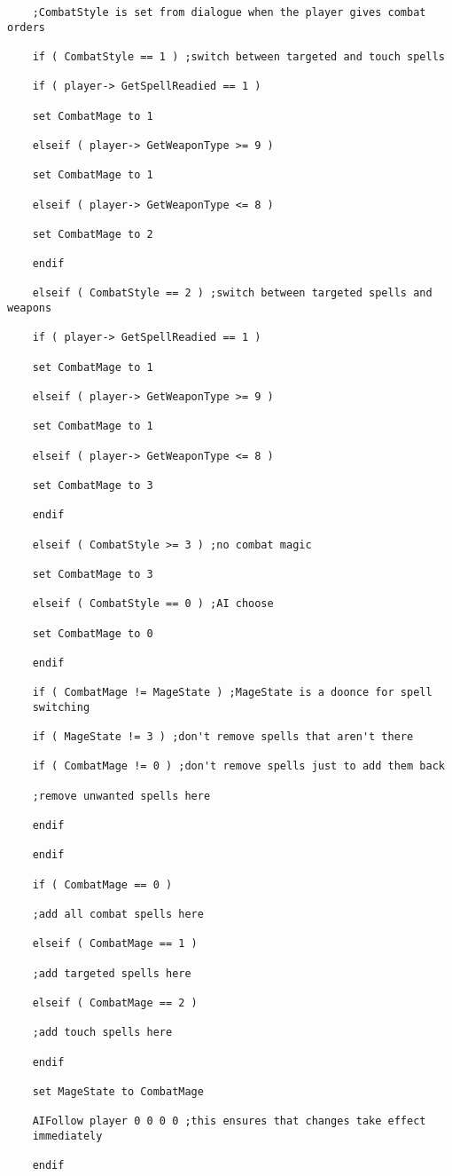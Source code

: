 \begin{lstlisting}
	;CombatStyle is set from dialogue when the player gives combat orders
	
	if ( CombatStyle == 1 ) ;switch between targeted and touch spells
	
	if ( player-> GetSpellReadied == 1 )
	
	set CombatMage to 1
	
	elseif ( player-> GetWeaponType >= 9 )
	
	set CombatMage to 1
	
	elseif ( player-> GetWeaponType <= 8 )
	
	set CombatMage to 2
	
	endif
	
	elseif ( CombatStyle == 2 ) ;switch between targeted spells and weapons
	
	if ( player-> GetSpellReadied == 1 )
	
	set CombatMage to 1
	
	elseif ( player-> GetWeaponType >= 9 )
	
	set CombatMage to 1
	
	elseif ( player-> GetWeaponType <= 8 )
	
	set CombatMage to 3
	
	endif
	
	elseif ( CombatStyle >= 3 ) ;no combat magic
	
	set CombatMage to 3
	
	elseif ( CombatStyle == 0 ) ;AI choose
	
	set CombatMage to 0
	
	endif
	
	if ( CombatMage != MageState ) ;MageState is a doonce for spell
	switching
	
	if ( MageState != 3 ) ;don't remove spells that aren't there
	
	if ( CombatMage != 0 ) ;don't remove spells just to add them back
	
	;remove unwanted spells here
	
	endif
	
	endif
	
	if ( CombatMage == 0 )
	
	;add all combat spells here
	
	elseif ( CombatMage == 1 )
	
	;add targeted spells here
	
	elseif ( CombatMage == 2 )
	
	;add touch spells here
	
	endif
	
	set MageState to CombatMage
	
	AIFollow player 0 0 0 0 ;this ensures that changes take effect
	immediately
	
	endif
\end{lstlisting}

